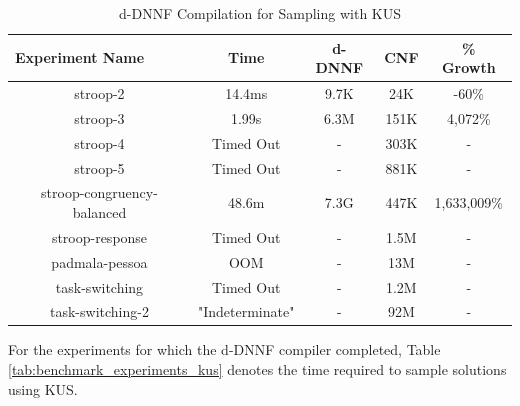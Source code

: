 \begin{table}[b]
  \centering
  \caption{d-DNNF Compilation for Sampling with KUS}
\begin{tabular}{|c|c|c|c|c|}
\hline
\multicolumn{1}{|l|}{Experiment Name} & Time            & d-DNNF               & CNF            & \% Growth   \\ \hline
stroop-2                              & 14.4ms          & 9.7K                 & 24K            & -60\%       \\ \hline
stroop-3                              & 1.99s           & 6.3M                 & 151K           & 4,072\%     \\ \hline
stroop-4                              & Timed Out       & -                    & 303K           & -           \\ \hline
stroop-5                              & Timed Out       & -                    & 881K           & -           \\ \hline
stroop-congruency-balanced            & 48.6m           & 7.3G                 & 447K           & 1,633,009\% \\ \hline
stroop-response                       & Timed Out       & -                    & 1.5M           & -           \\ \hline
padmala-pessoa                        & OOM             & -                    & 13M            & -           \\ \hline
task-switching                        & Timed Out       & -                    & 1.2M           & -           \\ \hline
task-switching-2                      & "Indeterminate" & -                    & 92M            & -           \\ \hline %
\end{tabular}
\label{tab:benchmark_experiments_d4}
\end{table}

For the experiments for which the d-DNNF compiler completed, Table \ref{tab:benchmark_experiments_kus} denotes the time required to sample solutions using KUS.



